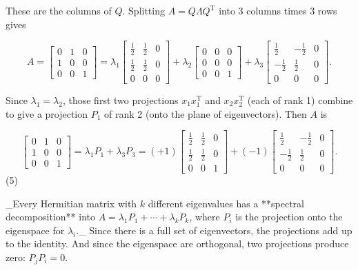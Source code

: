 These are the columns of \(Q\). Splitting \(A=Q\Lambda Q^{\mathrm{T}}\) into 3 columns times 3 rows gives

\[A=\begin{bmatrix}0&1&0\\ 1&0&0\\ 0&0&1\end{bmatrix}=\lambda_{1}\begin{bmatrix}\frac{1}{2}&\frac{1}{2}&0\\ \frac{1}{2}&\frac{1}{2}&0\\ 0&0&0\end{bmatrix}+\lambda_{2}\begin{bmatrix}0&0&0\\ 0&0&0\\ 0&0&1\end{bmatrix}+\lambda_{3}\begin{bmatrix}\frac{1}{2}&-\frac{1}{2}&0\\ -\frac{1}{2}&\frac{1}{2}&0\\ 0&0&0\end{bmatrix}.\]

Since \(\lambda_{1}=\lambda_{2}\), those first two projections \(x_{1}x_{1}^{\mathrm{T}}\) and \(x_{2}x_{2}^{\mathrm{T}}\) (each of rank 1) combine to give a projection \(P_{1}\) of rank 2 (onto the plane of eigenvectors). Then \(A\) is

\[\begin{bmatrix}0&1&0\\ 1&0&0\\ 0&0&1\end{bmatrix}=\lambda_{1}P_{1}+\lambda_{3}P_{3}=(+1)\begin{bmatrix} \frac{1}{2}&\frac{1}{2}&0\\ \frac{1}{2}&\frac{1}{2}&0\\ 0&0&1\end{bmatrix}+(-1)\begin{bmatrix}\frac{1}{2}&-\frac{1}{2}&0\\ -\frac{1}{2}&\frac{1}{2}&0\\ 0&0&0\end{bmatrix}.\] (5)

_Every Hermitian matrix with \(k\) different eigenvalues has a **spectral decomposition** into \(A=\lambda_{1}P_{1}+\cdots+\lambda_{k}P_{k}\), where \(P_{i}\) is the projection onto the eigenspace for \(\lambda_{i}\)._ Since there is a full set of eigenvectors, the projections add up to the identity. And since the eigenspace are orthogonal, two projections produce zero: \(P_{j}P_{i}=0\).

